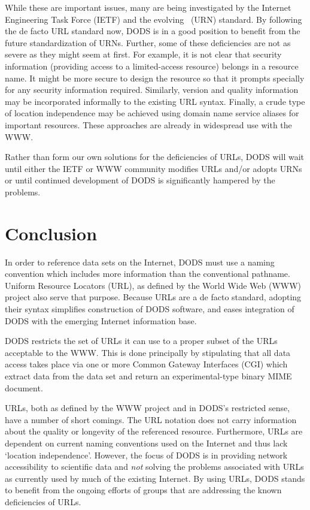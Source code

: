 While these are important issues, many are being investigated by the Internet
Engineering Task Force (IETF) and the evolving \urn\ (URN) standard. By
following the de facto URL standard now, DODS is in a good position to benefit
from the future standardization of URNs. Further, some of these deficiencies
are not as severe as they might seem at first. For example, it is not clear
that security information (providing access to a limited-access resource)
belongs in a resource name. It might be more secure to design the resource so
that it prompts specially for any security information required. Similarly,
version and quality information may be incorporated informally to the
existing URL syntax.  Finally, a crude type of location independence may be
achieved using domain name service aliases for important resources. These
approaches are already in widespread use with the WWW\@.

Rather than form our own solutions for the deficiencies of URLs, DODS will
wait until either the IETF or WWW community modifies URLs and/or adopts URNs
or until continued development of DODS is significantly hampered by the
problems. 

\section{Conclusion}

In order to reference data sets on the Internet, DODS must use a naming
convention which includes more information than the conventional
pathname. Uniform Resource Locators (URL), as defined by the World Wide Web
(WWW) project also serve that purpose. Because URLs are a de facto standard,
adopting their syntax simplifies construction of DODS software, and eases
integration of DODS with the emerging Internet information base.

DODS restricts the set of URLs it can use to a proper subset of the URLs
acceptable to the WWW\@. This is done principally by stipulating that all data
access takes place via one or more Common Gateway Interfaces (CGI) which
extract data from the data set and return an experimental-type binary MIME
document. 

URLs, both as defined by the WWW project and in DODS's restricted sense, have
a number of short comings. The URL notation does not carry information about
the quality or longevity of the referenced resource. Furthermore, URLs are
dependent on current naming conventions used on the Internet and thus lack
`location independence'. However, the focus of DODS is in providing network
accessibility to scientific data and {\em not\/} solving the problems
associated with URLs as currently used by much of the existing Internet. By
using URLs, DODS stands to benefit from the ongoing efforts of groups that
are addressing the known deficiencies of URLs.


